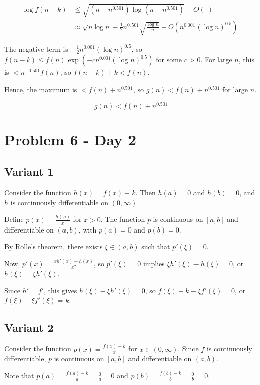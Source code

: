 \documentclass[12pt,a4paper]{article}
\theoremstyle{definition}
\begin{document}
    \begin{align}
        \log f(n - k) &\leq \sqrt{(n - n^{0.501}) \log (n - n^{0.501})} + O(\cdot) \\
        &\approx \sqrt{n \log n} - \frac{1}{2} n^{0.501} \sqrt{\frac{\log n}{n}} + O(n^{0.001} (\log n)^{0.5}).
    \end{align}

    The negative term is $-\frac{1}{2} n^{0.001} (\log n)^{0.5}$, so $f(n - k) \leq f(n) \exp(-c n^{0.001} (\log n)^{0.5})$ for some $c > 0$. For large $n$, this is $< n^{-0.501} f(n)$, so $f(n - k) + k < f(n)$.

    Hence, the maximum is $< f(n) + n^{0.501}$, so $g(n) < f(n) + n^{0.501}$ for large $n$.

    $$\boxed{g(n) < f(n) + n^{0.501}}$$


  \section{Problem 6 - Day 2}
\subsection{Variant 1}
    Consider the function $h(x) = f(x) - k$. Then $h(a) = 0$ and $h(b) = 0$, and $h$ is continuously differentiable on $(0, \infty)$.

    Define $p(x) = \frac{h(x)}{x}$ for $x > 0$. The function $p$ is continuous on $[a, b]$ and differentiable on $(a, b)$, with $p(a) = 0$ and $p(b) = 0$.

    By Rolle's theorem, there exists $\xi \in (a, b)$ such that $p'(\xi) = 0$.

    Now, $p'(x) = \frac{x h'(x) - h(x)}{x^2}$, so $p'(\xi) = 0$ implies $\xi h'(\xi) - h(\xi) = 0$, or $h(\xi) = \xi h'(\xi)$.

    Since $h' = f'$, this gives $h(\xi) - \xi h'(\xi) = 0$, so $f(\xi) - k - \xi f'(\xi) = 0$, or $f(\xi) - \xi f'(\xi) = k$.

\subsection{Variant 2}
    Consider the function $p(x) = \frac{f(x) - k}{x}$ for $x \in (0, \infty)$. Since $f$ is continuously differentiable, $p$ is continuous on $[a, b]$ and differentiable on $(a, b)$.

    Note that $p(a) = \frac{f(a) - k}{a} = \frac{0}{a} = 0$ and $p(b) = \frac{f(b) - k}{b} = \frac{0}{b} = 0$.
\end{document}
